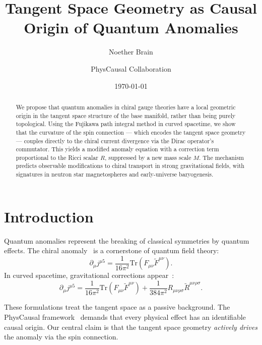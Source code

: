 \documentclass[reprint,aps,pra]{revtex4-2}
\begin{document}
\title{Tangent Space Geometry as Causal Origin of Quantum Anomalies}
\author{Noether Brain}
\author{PhysCausal Collaboration}
\date{\today}

\begin{abstract}
We propose that quantum anomalies in chiral gauge theories have a local geometric origin in the tangent space structure of the base manifold, rather than being purely topological. Using the Fujikawa path integral method in curved spacetime, we show that the curvature of the spin connection --- which encodes the tangent space geometry --- couples directly to the chiral current divergence via the Dirac operator's commutator. This yields a modified anomaly equation with a correction term proportional to the Ricci scalar $R$, suppressed by a new mass scale $M$. The mechanism predicts observable modifications to chiral transport in strong gravitational fields, with signatures in neutron star magnetospheres and early-universe baryogenesis.
\end{abstract}

\maketitle

\section{Introduction}

Quantum anomalies represent the breaking of classical symmetries by quantum effects. The chiral anomaly~\cite{adler1969,bell1969} is a cornerstone of quantum field theory:
\begin{equation}
\partial_\mu j^{\mu 5} = \frac{1}{16\pi^2} \text{Tr}(F_{\mu\nu} \tilde{F}^{\mu\nu}).
\label{eq:chiral}
\end{equation}
In curved spacetime, gravitational corrections appear~\cite{alvarez1985}:
\begin{equation}
\partial_\mu j^{\mu 5} = \frac{1}{16\pi^2} \text{Tr}(F_{\mu\nu} \tilde{F}^{\mu\nu}) 
+ \frac{1}{384\pi^2} R_{\mu\nu\rho\sigma} \tilde{R}^{\mu\nu\rho\sigma}.
\label{eq:grav}
\end{equation}

These formulations treat the tangent space as a passive background. The PhysCausal framework~\cite{physcausal2024} demands that every physical effect has an identifiable causal origin. Our central claim is that the tangent space geometry \emph{actively drives} the anomaly via the spin connection.
\end{document}
